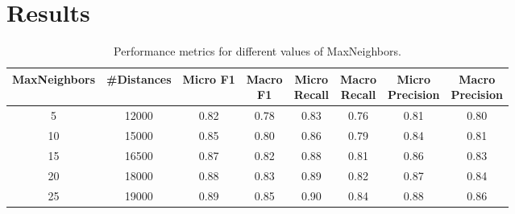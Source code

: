 \section{Results}

\begin{table}[ht]
\centering
\begin{tabular}{|c|c|c|c|c|c|c|c|}
\hline
\textbf{MaxNeighbors} & \textbf{\#Distances} & \textbf{Micro F1} & \makecell{\textbf{Macro} \\ \textbf{F1}} & \makecell{\textbf{Micro} \\ \textbf{Recall}} & \makecell{\textbf{Macro} \\ \textbf{Recall}} & \makecell{\textbf{Micro} \\ \textbf{Precision}} & \makecell{\textbf{Macro} \\ \textbf{Precision}} \\
\hline
5  & 12000 & 0.82 & 0.78 & 0.83 & 0.76 & 0.81 & 0.80 \\
10 & 15000 & 0.85 & 0.80 & 0.86 & 0.79 & 0.84 & 0.81 \\
15 & 16500 & 0.87 & 0.82 & 0.88 & 0.81 & 0.86 & 0.83 \\
20 & 18000 & 0.88 & 0.83 & 0.89 & 0.82 & 0.87 & 0.84 \\
25 & 19000 & 0.89 & 0.85 & 0.90 & 0.84 & 0.88 & 0.86 \\
\hline
\end{tabular}
\caption{Performance metrics for different values of MaxNeighbors.}
\label{tab:performance_metrics}
\end{table}